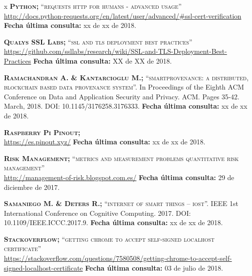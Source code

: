 \begin{thebibliography} {x}
	 \textsc{\textbf{Python; }}\textsc{“requests http for humans - advanced usage”} \\ 
	\url{http://docs.python-requests.org/en/latest/user/advanced/#ssl-cert-verification}
	\newline \textbf{Fecha última consulta:} xx de xx de 2018.
	
	 \textsc{\textbf{Qualys SSL Labs; }}\textsc{“ssl and tls deployment best practices”} \\
	\url{https://github.com/ssllabs/research/wiki/SSL-and-TLS-Deployment-Best-Practices}
	\newline \textbf{Fecha última consulta:} XX de XX de 2018.
		
	 \textsc{\textbf{Ramachandran A. \& Kantarcioglu M.; }} \textsc{“smartprovenance: a distributed, blockchain based data provenance system”.} In Proceedings of the Eighth ACM Conference on Data and Application Security and Privacy. ACM. Pages 35-42. March, 2018. DOI: 10.1145/3176258.3176333.
	\newline \textbf{Fecha última consulta:} xx de xx de 2018.
	
	 \textsc{\textbf{Raspberry Pi Pinout; }} \\ 
	\url{https://es.pinout.xyz/}
	\newline \textbf{Fecha última consulta:} xx de xx de 2018.
	
	 \textsc{\textbf{Risk Management; }}\textsc{“metrics and measurement problems quantitative risk management”} \\
	\url{http://management-of-risk.blogspot.com.es/}
	\newline \textbf{Fecha última consulta:} 29 de diciembre de 2017.
				

	 \textsc{\textbf{Samaniego M. \& Deters R.; }} \textsc{“internet of smart things – iost”.} IEEE 1st International Conference on Cognitive Computing. 2017. DOI: 10.1109/IEEE.ICCC.2017.9.	
	\newline \textbf{Fecha última consulta:} xx de xx de 2018.
	
	 \textsc{\textbf{Stackoverflow; }}\textsc{“getting chrome to accept self-signed localhost certificate”} \\ 
	\url{https://stackoverflow.com/questions/7580508/getting-chrome-to-accept-self-signed-localhost-certificate}
	\newline \textbf{Fecha última consulta:} 03 de julio de 2018.
		

\end{thebibliography}
